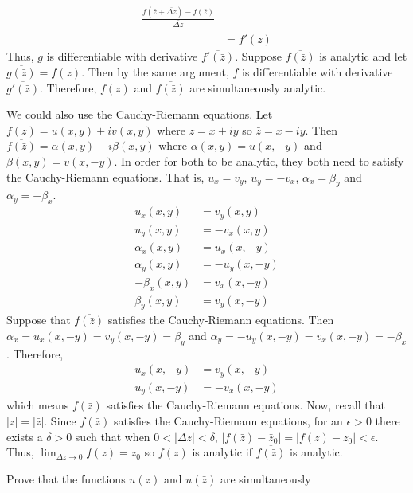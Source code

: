 \begin{exercise}
\begin{align*}
{            \frac{f(\bar{z} + \overline{\Delta z}) - f(\bar{z})}
            {\overline{\Delta z}}}\\
          & = \overline{f'(\bar{z})}
  \end{align*}
  Thus, \(g\) is differentiable with derivative \(\overline{f'(\bar{z})}\).
  Suppose \(\overline{f(\bar{z})}\) is analytic and let
  \(\overline{g(\bar{z})} = f(z)\).
  Then by the same argument, \(f\) is differentiable with derivative
  \(\overline{g'(\bar{z})}\).
  Therefore, \(f(z)\) and \(\overline{f(\bar{z})}\) are simultaneously
  analytic.
  \par\smallskip
  We could also use the Cauchy-Riemann equations.
  Let \(f(z) = u(x,y) + iv(x,y)\) where \(z = x + iy\) so \(\bar{z} = x - iy\).
  Then \(\overline{f(\bar{z})} = \alpha(x,y) - i\beta(x,y)\) where
  \(\alpha(x,y) = u(x,-y)\) and \(\beta(x,y) = v(x,-y)\).
  In order for both to be analytic, they both need to satisfy the
  Cauchy-Riemann equations.
  That is, \(u_x = v_y\), \(u_y = -v_x\), \(\alpha_x = \beta_y\) and
  \(\alpha_y = -\beta_x\).
  \begin{align*}
    u_x(x,y) & = v_y(x,y)\\
    u_y(x,y) & = -v_x(x,y)\\
    \alpha_x(x,y) & = u_x(x,-y)\\
    \alpha_y(x,y) & = -u_y(x,-y)\\
    -\beta_x(x,y) & = v_x(x,-y)\\
    \beta_y(x,y) & = v_y(x,-y)
  \end{align*}
  Suppose that \(\overline{f(\bar{z})}\) satisfies the Cauchy-Riemann
  equations.
  Then \(\alpha_x = u_x(x,-y) = v_y(x,-y) = \beta_y\) and
  \(\alpha_y = -u_y(x,-y) = v_x(x,-y) = -\beta_x\).
  Therefore,
  \begin{align*}
    u_x(x,-y) & = v_y(x,-y)\\
    u_y(x,-y) & = -v_x(x,-y)
  \end{align*}
  which means \(f(\bar{z})\) satisfies the Cauchy-Riemann equations.
  Now, recall that \(\lvert z\rvert = \lvert\bar{z}\rvert\).
  Since \(f(\bar{z})\) satisfies the Cauchy-Riemann equations, for an
  \(\epsilon > 0\) there exists a \(\delta > 0\) such that when 
  \(0 < \lvert\Delta z\rvert < \delta\),
  \(\lvert f(\bar{z}) - \bar{z}_0\rvert = \lvert f(z) - z_0\rvert < \epsilon\).
  Thus, \(\lim_{\Delta z\to 0}f(z) = z_0\) so \(f(z)\) is analytic if
  \(\overline{f(\bar{z})}\) is analytic.
\item
  Prove that the functions \(u(z)\) and \(u(\bar{z})\) are simultaneously

\end{exercise}
